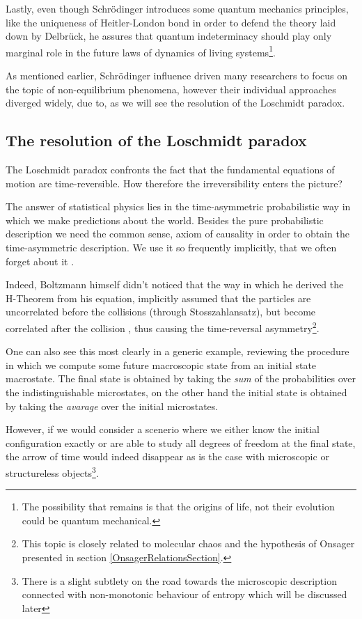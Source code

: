 \documentclass[a4paper,12pt]{article}
\begin{document}
Lastly, even though Schrödinger introduces some quantum mechanics principles, like the uniqueness of Heitler-London bond in order to defend the theory laid down by Delbrück, he assures that quantum indeterminacy should play only marginal role in the future laws of dynamics of living systems\footnote{The possibility that remains is that the origins of life, not their evolution could be quantum mechanical.}.

As mentioned earlier, Schrödinger influence driven many researchers to focus on the topic of non-equilibrium phenomena, however their individual approaches diverged widely, due to, as we will see the resolution of the Loschmidt paradox.

\subsection{The resolution of the Loschmidt paradox }

The Loschmidt paradox confronts the fact that the fundamental equations of motion are time-reversible. How therefore the irreversibility enters the picture?

The answer of statistical physics lies in the time-asymmetric probabilistic way in which we make predictions about the world. 
Besides the pure probabilistic description we need the common sense, axiom of causality in order to obtain the time-asymmetric description.
We use it so frequently implicitly, that we often forget about it \cite{Evans:2241458}. 

Indeed, Boltzmann himself didn't noticed that the way in which he derived the H-Theorem from his equation, implicitly assumed that the particles are uncorrelated before the collisions (through Stosszahlansatz), but become correlated after the collision \cite{Schwabl:2002} \cite{Dorfman:ozm67-zD}, thus causing the time-reversal asymmetry\footnote{This topic is closely related to molecular chaos and the hypothesis of Onsager presented in section \ref{OnsagerRelationsSection}.}.

One can also see this most clearly in a generic example, reviewing the procedure in which we compute some future macroscopic state from an initial state macrostate. The final state is obtained by taking the \textit{sum} of the probabilities over the indistinguishable microstates, on the other hand the initial state is obtained by taking the \textit{avarage} over the initial microstates.

However, if we would consider a scenerio where we either know the initial configuration exactly or are able to study all degrees of freedom at the final state, the arrow of time would indeed disappear as is the case with microscopic or structureless objects\footnote{There is a slight subtlety on the road towards the microscopic description connected with non-monotonic behaviour of entropy which will be discussed later}.
\end{document}
